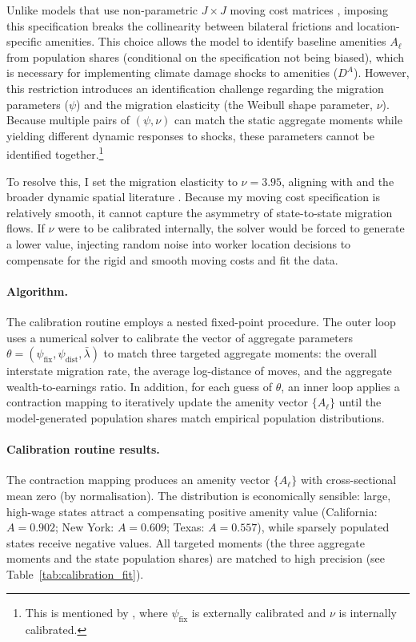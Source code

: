 \documentclass[11pt, a4paper]{article}
\begin{document}
Unlike models that use non-parametric $J \times J$ moving cost matrices \citep[e.g.,][]{dvorkin_geography_2025}, imposing this specification breaks the collinearity between bilateral frictions and location-specific amenities. This choice allows the model to identify baseline amenities $A_\ell$ from population shares (conditional on the specification not being biased), which is necessary for implementing climate damage shocks to amenities ($D^A$). However, this restriction introduces an identification challenge regarding the migration parameters ($\psi$) and the migration elasticity (the Weibull shape parameter, $\nu$). Because multiple pairs of $(\psi, \nu)$ can match the static aggregate moments while yielding different dynamic responses to shocks, these parameters cannot be identified together.\footnote{This is mentioned by \citet{sun_wealth_2025}, where $\psi_{\text{fix}}$ is externally calibrated and $\nu$ is internally calibrated.}

To resolve this, I set the migration elasticity to $\nu = 3.95$, aligning with \citet{dvorkin_geography_2025} and the broader dynamic spatial literature \citet{caliendo_trade_2019, kleinman_dynamic_2023, kennan_effect_2011}.  Because my moving cost specification is relatively smooth, it cannot capture the asymmetry of state-to-state migration flows. If $\nu$ were to be calibrated internally, the solver would be forced to generate a lower value, injecting random noise into worker location decisions to compensate for the rigid and smooth moving costs and fit the data.

\paragraph{Algorithm.}
The calibration routine employs a nested fixed-point procedure. The outer loop uses a numerical solver to calibrate the vector of aggregate parameters $\theta = (\psi_{\text{fix}}, \psi_{\text{dist}}, \bar\lambda)$ to match three targeted aggregate moments: the overall interstate migration rate, the average log-distance of moves, and the aggregate wealth-to-earnings ratio. In addition, for each guess of $\theta$, an inner loop applies a contraction mapping to iteratively update the amenity vector $\{A_\ell\}$ until the model-generated population shares match empirical population distributions. 

\paragraph{Calibration routine results.} The contraction mapping produces an amenity vector $\{A_\ell\}$ with cross-sectional mean zero (by normalisation). The distribution is economically sensible: large, high-wage states attract a compensating positive amenity value (California: $A = 0.902$; New York: $A = 0.609$; Texas: $A = 0.557$), while sparsely populated states receive negative values. All targeted moments (the three aggregate moments and the state population shares) are matched to high precision (see Table~\ref{tab:calibration_fit}).
\end{document}
